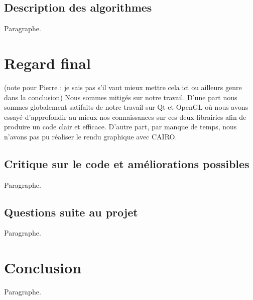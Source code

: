 \documentclass[11pt]{article}
\begin{document}
\subsection{Description des algorithmes}

Paragraphe.

\section{Regard final}

(note pour Pierre : je sais pas s'il vaut mieux mettre cela ici ou ailleurs
genre dans la conclusion)
Nous sommes mitigés sur notre travail. D'une part nous sommes globalement 
satifaits de notre travail sur Qt et OpenGL où nous avons essayé 
d'approfondir au mieux nos connaissances sur ces deux librairies afin de 
produire un code clair et efficace. D'autre part, par manque de temps, 
nous n'avons pas pu réaliser le rendu graphique avec CAIRO.

\subsection{Critique sur le code et améliorations possibles}

Paragraphe.

\subsection{Questions suite au projet}

Paragraphe.

\section{Conclusion}

Paragraphe.
\end{document}
